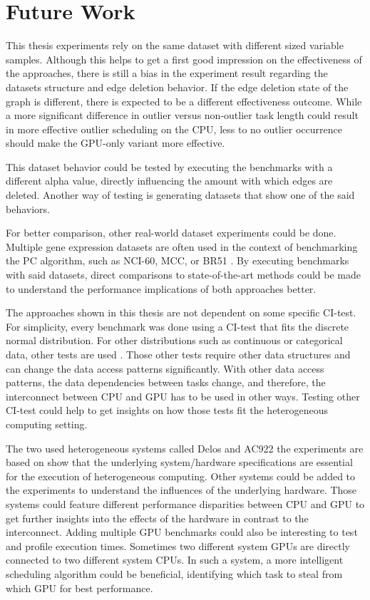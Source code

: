 \chapter{Future Work}
This thesis experiments rely on the same dataset with different sized variable samples. Although this helps to get a first good impression on the effectiveness of the approaches, there is still a bias in the experiment result regarding the datasets structure and edge deletion behavior. If the edge deletion state of the graph is different, there is expected to be a different effectiveness outcome. While a more significant difference in outlier versus non-outlier task length could result in more effective outlier scheduling on the CPU, less to no outlier occurrence should make the GPU-only variant more effective.

This dataset behavior could be tested by executing the benchmarks with a different alpha value, directly influencing the amount with which edges are deleted. Another way of testing is generating datasets that show one of the said behaviors.

For better comparison, other real-world dataset experiments could be done. Multiple gene expression datasets are often used in the context of benchmarking the PC algorithm, such as NCI-60, MCC, or BR51 \cite{leFastPCAlgorithm2019}. By executing benchmarks with said datasets, direct comparisons to state-of-the-art methods could be made to understand the performance implications of both approaches better.

The approaches shown in this thesis are not dependent on some specific CI-test. For simplicity, every benchmark was done using a CI-test that fits the discrete normal distribution. For other distributions such as continuous or categorical data, other tests are used \cite{scutariLearningBayesianNetworks2010}. Those other tests require other data structures and can change the data access patterns significantly. With other data access patterns, the data dependencies between tasks change, and therefore, the interconnect between CPU and GPU has to be used in other ways. Testing other CI-test could help to get insights on how those tests fit the heterogeneous computing setting.

The two used heterogeneous systems called Delos and AC922 the experiments are based on show that the underlying system/hardware specifications are essential for the execution of heterogeneous computing. Other systems could be added to the experiments to understand the influences of the underlying hardware. Those systems could feature different performance disparities between CPU and GPU to get further insights into the effects of the hardware in contrast to the interconnect. Adding multiple GPU benchmarks could also be interesting to test and profile execution times. Sometimes two different system GPUs are directly connected to two different system CPUs. In such a system, a more intelligent scheduling algorithm could be beneficial, identifying which task to steal from which GPU for best performance.

